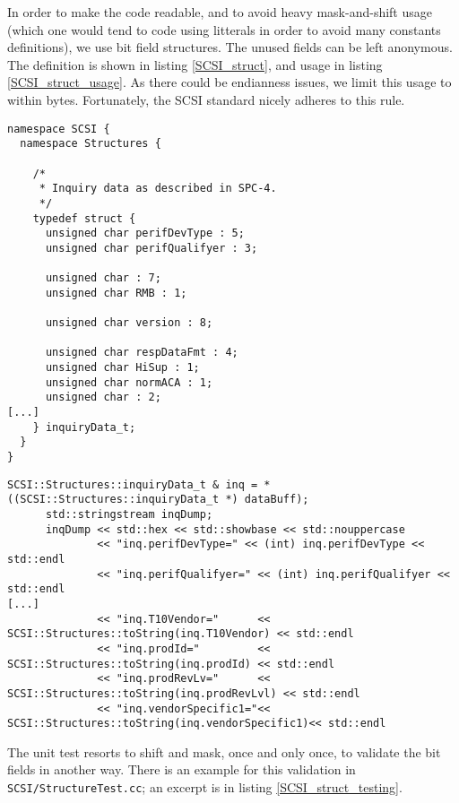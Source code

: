 In order to make the code readable, and to avoid heavy mask-and-shift usage (which one would tend
to code using litterals in order to avoid many constants definitions), we use bit field structures.
The unused fields can be left anonymous.
The definition is shown in listing \ref{SCSI_struct}, and usage in listing \ref{SCSI_struct_usage}.
As there could be endianness issues, we limit this usage to within bytes. Fortunately, the SCSI 
standard nicely adheres to this rule.

\begin{table}[h]
\begin{lstlisting}[caption=SCSI::Structures example,label=SCSI_struct]
namespace SCSI {
  namespace Structures {

    /*
     * Inquiry data as described in SPC-4.
     */
    typedef struct {
      unsigned char perifDevType : 5;
      unsigned char perifQualifyer : 3;

      unsigned char : 7;
      unsigned char RMB : 1;

      unsigned char version : 8;

      unsigned char respDataFmt : 4;
      unsigned char HiSup : 1;
      unsigned char normACA : 1;
      unsigned char : 2;
[...]
    } inquiryData_t;
  }
}
\end{lstlisting}
\end{table}

\begin{table}[h]
\begin{lstlisting}[caption=SCSI::Structures usage example,label=SCSI_struct_usage]
      SCSI::Structures::inquiryData_t & inq = *((SCSI::Structures::inquiryData_t *) dataBuff);
      std::stringstream inqDump;
      inqDump << std::hex << std::showbase << std::nouppercase
              << "inq.perifDevType=" << (int) inq.perifDevType << std::endl
              << "inq.perifQualifyer=" << (int) inq.perifQualifyer << std::endl
[...]
              << "inq.T10Vendor="      << SCSI::Structures::toString(inq.T10Vendor) << std::endl
              << "inq.prodId="         << SCSI::Structures::toString(inq.prodId) << std::endl
              << "inq.prodRevLv="      << SCSI::Structures::toString(inq.prodRevLvl) << std::endl
              << "inq.vendorSpecific1="<< SCSI::Structures::toString(inq.vendorSpecific1)<< std::endl
\end{lstlisting}
\end{table}

The unit test resorts to shift and mask, once and only once, to validate the bit fields in
another way. There is an example for this validation in \verb#SCSI/StructureTest.cc#; an excerpt is in listing \ref{SCSI_struct_testing}.

